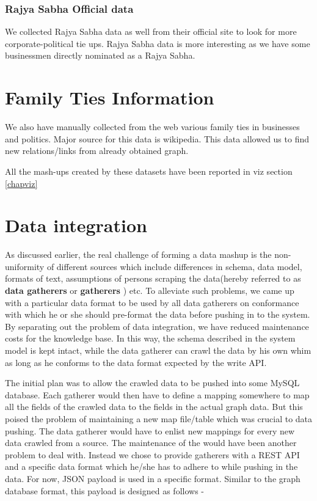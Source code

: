 \subsubsection{Rajya Sabha Official data}

We collected Rajya Sabha data as well from their official site to look for more corporate-political tie ups. Rajya Sabha data is more interesting as we have some businessmen directly nominated as a Rajya Sabha.  

\section{Family Ties Information}

We also have manually collected from the web various family ties in businesses and politics. Major source for this data is wikipedia. This data allowed us to find new relations/links from already obtained graph.\cite{indianbfamilies} \cite{indianpfamilies}


All the mash-ups created by these datasets have been reported in viz section \ref{chapviz}

\section{Data integration}
\label{dataint}

As discussed earlier, the real challenge of forming a data mashup is the non-uniformity of different sources which include differences in schema, data model, formats of text, assumptions of persons scraping the data(hereby referred to as \textbf{ data gatherers } or \textbf{ gatherers }) etc. To alleviate such problems, we came up with a particular data format to be used by all data gatherers on conformance with which he or she should pre-format the data before pushing in to the system. By separating out the problem of data integration, we have reduced maintenance costs for the knowledge base. In this way, the schema described in the system model is kept intact, while the data gatherer can crawl the data by his own whim as long as he conforms to the data format expected by the write API.

The initial plan was to allow the crawled data to be pushed into some MySQL database. Each gatherer would then have to define a mapping somewhere to map all the fields of the crawled data to the fields in the actual graph data. But this poised the problem of maintaining a new map file/table which was crucial to data pushing. The data gatherer would have to enlist new mappings for every new data crawled from a source. The maintenance of the  would have been another problem to deal with.
%
Instead we chose to provide gatherers with a REST API and  a specific data format which he/she has to adhere to while pushing in the data.
For now, JSON payload is used in a specific format. Similar to the graph database format, this payload is designed as follows -

